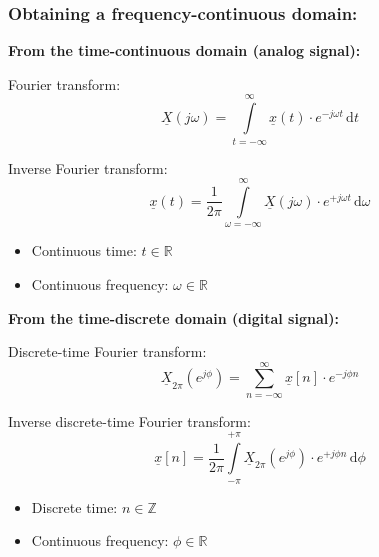 \begin{refsection}
\subsubsection{Obtaining a frequency-continuous domain:}

\begin{minipage}{0.45\linewidth}
	\textbf{From the time-continuous domain (analog signal):}
	
	\vspace{0.5em}
	
	Fourier transform:
	\begin{equation*}
		\underline{X}(j \omega) = \int\limits_{t = -\infty}^{\infty} \underline{x}(t) \cdot e^{-j \omega t} \, \mathrm{d} t
	\end{equation*}
	
	Inverse Fourier transform:
	\begin{equation*}
		\underline{x}(t) = \frac{1}{2 \pi} \int\limits_{\omega = -\infty}^{\infty} \underline{X}(j \omega) \cdot e^{+ j \omega t} \, \mathrm{d} \omega
	\end{equation*}
	
	\begin{itemize}
		\item Continuous time: $t \in \mathbb{R}$
		\item Continuous frequency: $\omega \in \mathbb{R}$
	\end{itemize}
\end{minipage}
\hfill
\begin{minipage}{0.45\linewidth}
	\textbf{From the time-discrete domain (digital signal):}
	
	\vspace{0.5em}
	
	Discrete-time Fourier transform:
	\begin{equation*}
		\underline{X}_{2\pi}(e^{j \phi}) = \sum\limits_{n = -\infty}^{\infty} \underline{x}[n] \cdot e^{- j \phi n}
	\end{equation*}
	
	Inverse discrete-time Fourier transform:
	\begin{equation*}
		\underline{x}[n] = \frac{1}{2 \pi} \int\limits_{- \pi}^{+ \pi} \underline{X}_{2\pi}(e^{j \phi}) \cdot e^{+ j \phi n} \, \mathrm{d} \phi
	\end{equation*}
	
	\begin{itemize}
		\item Discrete time: $n \in \mathbb{Z}$
		\item Continuous frequency: $\phi \in \mathbb{R}$
	\end{itemize}
\end{minipage}


\end{refsection}
